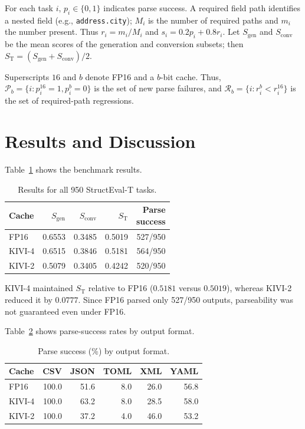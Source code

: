 \documentclass[twocolumn,a4paper]{ieicejsp}
\begin{document}
For each task $i$, $p_i\in\{0,1\}$ indicates parse success.  A required field
path identifies a nested field (e.g., \texttt{address.city}); $M_i$ is the
number of required paths and $m_i$ the number present.  Thus $r_i=m_i/M_i$ and
$s_i=0.2p_i+0.8r_i$.  Let $S_{\mathrm{gen}}$ and $S_{\mathrm{conv}}$ be the
mean scores of the generation and conversion subsets; then
$S_{\mathrm{T}}=(S_{\mathrm{gen}}+S_{\mathrm{conv}})/2$.

Superscripts $16$ and $b$ denote FP16 and a $b$-bit cache.  Thus,
$\mathcal{P}_b=\{i:p_i^{16}=1,p_i^b=0\}$ is the set of new parse failures, and
$\mathcal{R}_b=\{i:r_i^b<r_i^{16}\}$ is the set of required-path regressions.

\section{Results and Discussion}
Table~\ref{tab:structeval} shows the benchmark results.
\begin{table}[H]
\centering
\caption{Results for all 950 StructEval-T tasks.}
\label{tab:structeval}
\setlength{\tabcolsep}{5.0pt}
\begin{tabular}{lrrrr}
Cache & $S_{\mathrm{gen}}$ & $S_{\mathrm{conv}}$ & $S_{\mathrm{T}}$
& \shortstack{Parse\\success} \\
\hline
FP16   & 0.6553 & 0.3485 & 0.5019 & 527/950 \\
KIVI-4 & 0.6515 & 0.3846 & 0.5181 & 564/950 \\
KIVI-2 & 0.5079 & 0.3405 & 0.4242 & 520/950 \\
\hline
\end{tabular}
\end{table}

KIVI-4 maintained $S_{\mathrm{T}}$ relative to FP16 ($0.5181$ versus $0.5019$),
whereas KIVI-2 reduced it by $0.0777$.  Since FP16 parsed only 527/950 outputs,
parseability was not guaranteed even under FP16.

Table~\ref{tab:format} shows parse-success rates by output format.
\begin{table}[H]
\centering
\caption{Parse success (\%) by output format.}
\label{tab:format}
\setlength{\tabcolsep}{2.5pt}
{\scriptsize
\begin{tabular}{lrrrrr}
Cache & CSV & JSON & TOML & XML & YAML \\
\hline
FP16   & 100.0 & 51.6 & 8.0 & 26.0 & 56.8 \\
KIVI-4 & 100.0 & 63.2 & 8.0 & 28.5 & 58.0 \\
KIVI-2 & 100.0 & 37.2 & 4.0 & 46.0 & 53.2 \\
\hline
\end{tabular}
}
\end{table}
\end{document}
